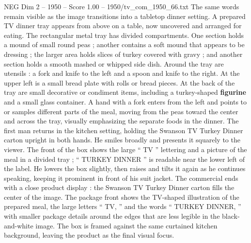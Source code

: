 \begin{textsample}{NEG Dim 2 – 1950 – Score 1.00 – 1950/tv\_com\_1950\_66.txt}
The same words remain visible as the image transitions into a tabletop dinner setting.
A prepared TV dinner tray appears from above on a table, now uncovered and arranged for eating.
The rectangular metal tray has divided compartments.
One section holds a mound of small round peas ; another contains a soft mound that appears to be dressing ; the larger area holds slices of turkey covered with gravy ; and another section holds a smooth mashed or whipped side dish.
Around the tray are utensils : a fork and knife to the left and a spoon and knife to the right.
At the upper left is a small bread plate with rolls or bread pieces.
At the back of the tray are small decorative or condiment items, including a turkey-shaped \textbf{figurine} and a small glass container.
A hand with a fork enters from the left and points to or samples different parts of the meal, moving from the peas toward the center and across the tray, visually emphasizing the separate foods in the dinner.
The first man returns in the kitchen setting, holding the Swanson TV Turkey Dinner carton upright in both hands.
He smiles broadly and presents it squarely to the viewer.
The front of the box shows the large “ TV ” lettering and a picture of the meal in a divided tray ; “ TURKEY DINNER ” is readable near the lower left of the label.
He lowers the box slightly, then raises and tilts it again as he continues speaking, keeping it prominent in front of his suit jacket.
The commercial ends with a close product display : the Swanson TV Turkey Dinner carton fills the center of the image.
The package front shows the TV-shaped illustration of the prepared meal, the large letters “ TV, ” and the words “ TURKEY DINNER, ” with smaller package details around the edges that are less legible in the black-and-white image.
The box is framed against the same curtained kitchen background, leaving the product as the final visual focus.

\end{textsample}
